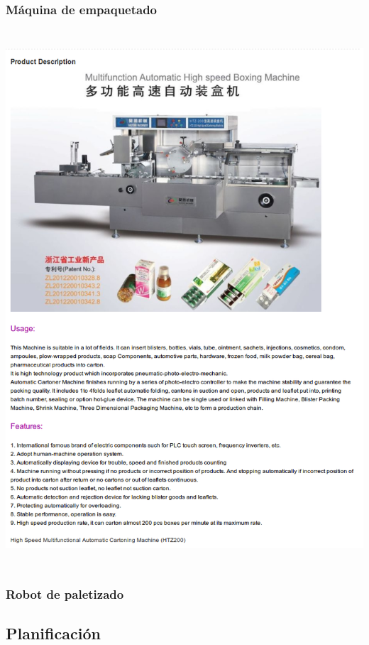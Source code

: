 \subsubsection{Máquina de empaquetado}
\includegraphics[width=15cm,height=20cm,keepaspectratio]{Datasheets/7MaquinaEmpaquetado.png} 
\newpage
\subsubsection{Robot de paletizado}

\subsection{Planificación}

